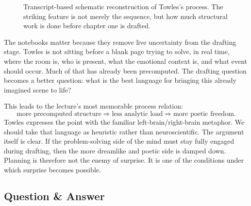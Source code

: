 \begin{figure}[h]
\centering
{}
\caption{Transcript-based schematic reconstruction of Towles's process. The striking feature is not merely the sequence, but how much structural work is done before chapter one is drafted.}
\end{figure}

The notebooks matter because they remove live uncertainty from the drafting stage. Towles is not sitting before a blank page trying to solve, in real time, where the room is, who is present, what the emotional context is, and what event should occur. Much of that has already been precomputed. The drafting question becomes a better question: what is the best language for bringing this already imagined scene to life?

This leads to the lecture's most memorable process relation:
\begin{equation}
\text{more precomputed structure} \Rightarrow \text{less analytic load} \Rightarrow \text{more poetic freedom}.
\end{equation}
Towles expresses the point with the familiar left-brain/right-brain metaphor. We should take that language as heuristic rather than neuroscientific. The argument itself is clear. If the problem-solving side of the mind must stay fully engaged during drafting, then the more dreamlike and poetic side is damped down. Planning is therefore not the enemy of surprise. It is one of the conditions under which surprise becomes possible.

\subsection{Question \& Answer}

